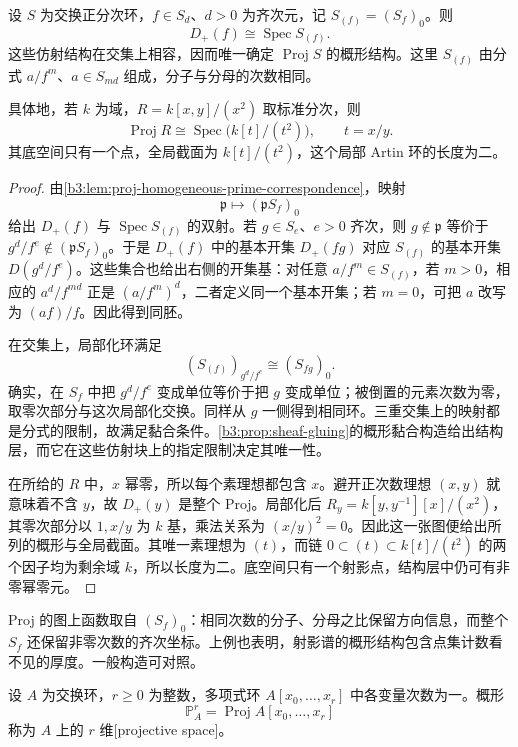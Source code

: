 \begin{theorem}\label{b3:thm:proj-affine-charts}\label{b3:thm:fat-projective-point}
	设 \(S\) 为交换正分次环，\(f\in S_d\)、\(d>0\) 为齐次元，记 \(S_{(f)}=(S_f)_0\)。则
	\[
		D_+(f)\cong\operatorname{Spec}S_{(f)}.
	\]
	这些仿射结构在交集上相容，因而唯一确定 \(\operatorname{Proj}S\) 的概形结构。这里 \(S_{(f)}\) 由分式 \(a/f^m\)、\(a\in S_{md}\) 组成，分子与分母的次数相同。

	具体地，若 \(k\) 为域，\(R=k[x,y]/(x^2)\) 取标准分次，则
	\[
		\operatorname{Proj}R\cong\operatorname{Spec}\bigl(k[t]/(t^2)\bigr), \qquad t=x/y.
	\]
	其底空间只有一个点，全局截面为 \(k[t]/(t^2)\)，这个局部 Artin 环的长度为二。
\end{theorem}
\begin{proof}
	由\cref{b3:lem:proj-homogeneous-prime-correspondence}，映射
	\[
		\mathfrak p\longmapsto(\mathfrak pS_f)_0
	\]
	给出 \(D_+(f)\) 与 \(\operatorname{Spec}S_{(f)}\) 的双射。若 \(g\in S_e\)、\(e>0\) 齐次，则 \(g\notin\mathfrak p\) 等价于 \(g^d/f^e\notin(\mathfrak pS_f)_0\)。于是 \(D_+(f)\) 中的基本开集 \(D_+(fg)\) 对应 \(S_{(f)}\) 的基本开集 \(D(g^d/f^e)\)。这些集合也给出右侧的开集基：对任意 \(a/f^m\in S_{(f)}\)，若 \(m>0\)，相应的 \(a^d/f^{md}\) 正是 \((a/f^m)^d\)，二者定义同一个基本开集；若 \(m=0\)，可把 \(a\) 改写为 \((af)/f\)。因此得到同胚。

	在交集上，局部化环满足
	\[
		(S_{(f)})_{g^d/f^e}\cong(S_{fg})_0.
	\]
	确实，在 \(S_f\) 中把 \(g^d/f^e\) 变成单位等价于把 \(g\) 变成单位；被倒置的元素次数为零，取零次部分与这次局部化交换。同样从 \(g\) 一侧得到相同环。三重交集上的映射都是分式的限制，故满足黏合条件。\cref{b3:prop:sheaf-gluing}的概形黏合构造给出结构层，而它在这些仿射块上的指定限制决定其唯一性。

	在所给的 \(R\) 中，\(x\) 幂零，所以每个素理想都包含 \(x\)。避开正次数理想 \((x,y)\) 就意味着不含 \(y\)，故 \(D_+(y)\) 是整个 Proj。局部化后 \(R_y=k[y,y^{-1}][x]/(x^2)\)，其零次部分以 \(1,x/y\) 为 \(k\) 基，乘法关系为 \((x/y)^2=0\)。因此这一张图便给出所列的概形与全局截面。其唯一素理想为 \((t)\)，而链 \(0\subset(t)\subset k[t]/(t^2)\) 的两个因子均为剩余域 \(k\)，所以长度为二。底空间只有一个射影点，结构层中仍可有非零幂零元。
\end{proof}

Proj 的图上函数取自 \((S_f)_0\)：相同次数的分子、分母之比保留方向信息，而整个 \(S_f\) 还保留非零次数的齐次坐标。上例也表明，射影谱的概形结构包含点集计数看不见的厚度。一般构造可对照\cite[Chapter II, Proposition 2.5, pp. 76--77]{Hartshorne1977}。

\begin{definition}\label{b3:def:projective-space}
	设 \(A\) 为交换环，\(r\ge0\) 为整数，多项式环 \(A[x_0,\ldots,x_r]\) 中各变量次数为一。概形
	\[
		\mathbb P_A^r=\operatorname{Proj}A[x_0,\ldots,x_r]
	\]
	称为 \(A\) 上的 \(r\) 维[projective space]。
\end{definition}

